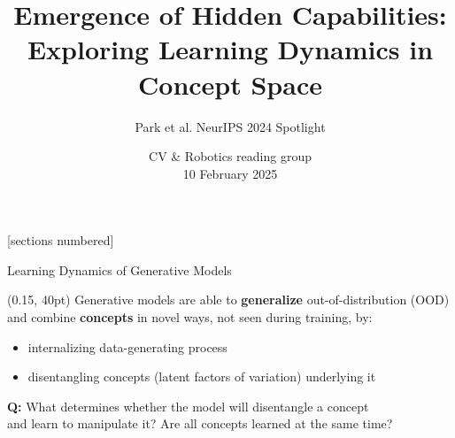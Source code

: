 

\usepackage{amsmath}
\usepackage{booktabs}
\usepackage{rotating}
\usepackage{wasysym}
\usepackage{ulem}
\usepackage{multirow}


\graphicspath{{images/}}

\title{Emergence of Hidden Capabilities: Exploring Learning Dynamics in Concept Space}

\subtitle{Park et al. NeurIPS 2024 Spotlight}

\date{CV \& Robotics reading group \\ 10 February 2025\vspace{6pt}}

\newcommand{\yes}{\CIRCLE}
\newcommand{\no}{\Circle}
\newcommand{\partially}{\LEFTcircle}

[sections numbered]





\begin{frame}[plain]
  \titlepage{}
\end{frame}

\begin{frame}[t]{Learning Dynamics of Generative Models}
    \begin{textblock*}{\paperwidth} (0.15\paperwidth, 40pt)
        Generative models are able to \textbf{generalize} out-of-distribution (OOD)\\ and combine \textbf{concepts} in novel ways, not seen during training, by:
        \begin{itemize}
        \item internalizing data-generating process
        \item disentangling concepts (latent factors of variation) underlying it
    \end{itemize}

        \vspace{0.8cm}

        \textbf{Q:} What determines whether the model will disentangle a concept \\and learn to manipulate it? Are all concepts learned at the same time?
   \end{textblock*}
\end{frame}

